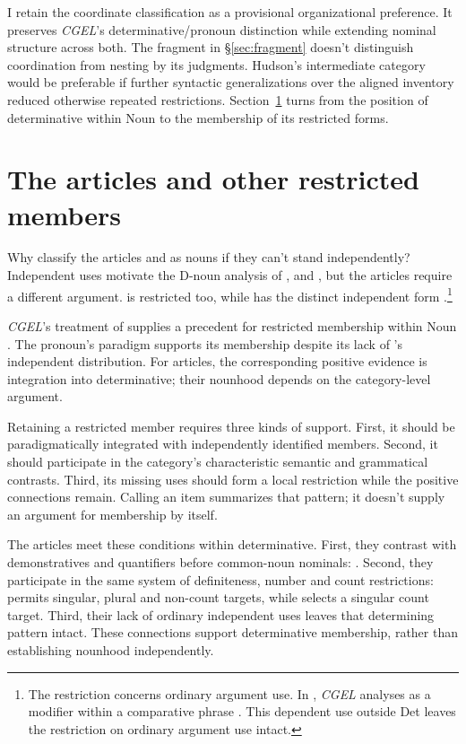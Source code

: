 \documentclass[12pt]{article}
\begin{document}
I retain the coordinate classification as a provisional organizational preference. It preserves \textit{CGEL}'s determinative/pronoun distinction while extending nominal structure across both. The fragment in §\ref{sec:fragment} doesn't distinguish coordination from nesting by its judgments. Hudson's intermediate category would be preferable if further syntactic generalizations over the aligned inventory reduced otherwise repeated restrictions. Section~\ref{sec:articles} turns from the position of determinative within Noun to the membership of its restricted forms.

\section{The articles and other restricted members}\label{sec:articles}

Why classify the articles  and  as nouns if they can't stand independently? Independent uses motivate the D-noun analysis of ,  and , but the articles require a different argument.  is restricted too, while  has the distinct independent form  \citep[371--372, 410--411]{huddleston2002}.\footnote{The restriction concerns ordinary argument use. In , \textit{CGEL} analyses  as a modifier within a comparative phrase \citep[1131--1132, 1135--1136]{huddleston2002}. This dependent use outside Det leaves the restriction on ordinary argument use intact.}

\textit{CGEL}'s treatment of  supplies a precedent for restricted membership within Noun \citep[470--471]{huddleston2002}. The pronoun's paradigm supports its membership despite its lack of 's independent distribution. For articles, the corresponding positive evidence is integration into determinative; their nounhood depends on the category-level argument.

Retaining a restricted member requires three kinds of support. First, it should be paradigmatically integrated with independently identified members. Second, it should participate in the category's characteristic semantic and grammatical contrasts. Third, its missing uses should form a local restriction while the positive connections remain. Calling an item  summarizes that pattern; it doesn't supply an argument for membership by itself.

The articles meet these conditions within determinative. First, they contrast with demonstratives and quantifiers before common-noun nominals: . Second, they participate in the same system of definiteness, number and count restrictions:  permits singular, plural and non-count targets, while  selects a singular count target. Third, their lack of ordinary independent uses leaves that determining pattern intact. These connections support determinative membership, rather than establishing nounhood independently.
\end{document}
